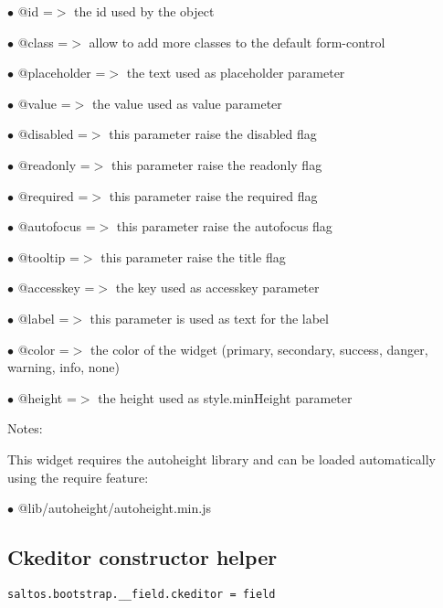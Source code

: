 \documentclass[a4paper]{book}
\begin{document}
\begin{compactitem}
\item[\color{myblue}$\bullet$] @id          =$>$ the id used by the object
\item[\color{myblue}$\bullet$] @class       =$>$ allow to add more classes to the default form-control
\item[\color{myblue}$\bullet$] @placeholder =$>$ the text used as placeholder parameter
\item[\color{myblue}$\bullet$] @value       =$>$ the value used as value parameter
\item[\color{myblue}$\bullet$] @disabled    =$>$ this parameter raise the disabled flag
\item[\color{myblue}$\bullet$] @readonly    =$>$ this parameter raise the readonly flag
\item[\color{myblue}$\bullet$] @required    =$>$ this parameter raise the required flag
\item[\color{myblue}$\bullet$] @autofocus   =$>$ this parameter raise the autofocus flag
\item[\color{myblue}$\bullet$] @tooltip     =$>$ this parameter raise the title flag
\item[\color{myblue}$\bullet$] @accesskey   =$>$ the key used as accesskey parameter
\item[\color{myblue}$\bullet$] @label       =$>$ this parameter is used as text for the label
\item[\color{myblue}$\bullet$] @color       =$>$ the color of the widget (primary, secondary, success, danger, warning, info, none)
\item[\color{myblue}$\bullet$] @height      =$>$ the height used as style.minHeight parameter
\end{compactitem}

Notes:

This widget requires the autoheight library and can be loaded automatically using the require
feature:

\begin{compactitem}
\item[\color{myblue}$\bullet$] @lib/autoheight/autoheight.min.js
\end{compactitem}

\hypertarget{toc469}{}
\subsection{Ckeditor constructor helper}

\begin{lstlisting}
saltos.bootstrap.__field.ckeditor = field
\end{lstlisting}
\end{document}
